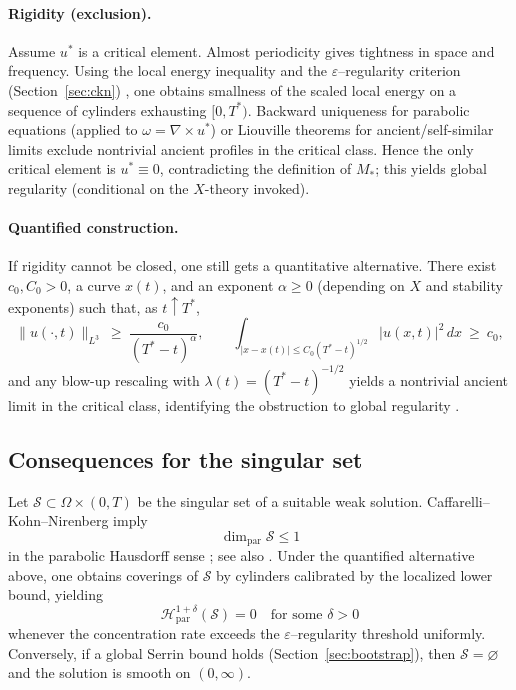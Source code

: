 \IfFileExists{nyjm.cls}{\documentclass[11pt]{nyjm}}{\documentclass[11pt]{amsart}}
\theoremstyle{plain}
\theoremstyle{definition}
\theoremstyle{remark}
\begin{document}
\paragraph{Rigidity (exclusion).}
Assume $u^\ast$ is a critical element. Almost periodicity gives tightness in space and frequency. Using the local energy inequality and the $\varepsilon$–regularity criterion (Section~\ref{sec:ckn}) \cite{CaffarelliKohnNirenberg1982,Lin1998}, one obtains smallness of the scaled local energy on a sequence of cylinders exhausting $[0,T^\ast)$. Backward uniqueness for parabolic equations \cite{EscauriazaSereginSverak2003} (applied to $\omega=\nabla\times u^\ast$) or Liouville theorems for ancient/self-similar limits \cite{NecasRuzickaSverak1996,Tsai1998} exclude nontrivial ancient profiles in the critical class. Hence the only critical element is $u^\ast\equiv0$, contradicting the definition of $M_\ast$; this yields global regularity (conditional on the $X$-theory invoked).

\paragraph{Quantified construction.}
If rigidity cannot be closed, one still gets a quantitative alternative. There exist $c_0,C_0>0$, a curve $x(t)$, and an exponent $\alpha\ge0$ (depending on $X$ and stability exponents) such that, as $t\uparrow T^\ast$,
\[
\|u(\cdot,t)\|_{L^3}\ \ge\ \frac{c_0}{(T^\ast-t)^{\alpha}},\qquad
\int_{|x-x(t)|\le C_0 (T^\ast-t)^{1/2}} |u(x,t)|^2\,dx \ \ge\ c_0,
\]
and any blow-up rescaling with $\lambda(t)=(T^\ast-t)^{-1/2}$ yields a nontrivial ancient limit in the critical class, identifying the obstruction to global regularity \cite{EscauriazaSereginSverak2003,LemarieRieusset2002}.

\subsection{Consequences for the singular set}\label{subsec:singular-set}
Let $\mathcal S\subset\Omega\times(0,T)$ be the singular set of a suitable weak solution. Caffarelli–Kohn–Nirenberg imply
\[
\dim_{\mathrm{par}}\mathcal S\le 1
\]
in the parabolic Hausdorff sense \cite{CaffarelliKohnNirenberg1982}; see also \cite{Lin1998}. Under the quantified alternative above, one obtains coverings of $\mathcal S$ by cylinders calibrated by the localized lower bound, yielding
\[
\mathcal H^{1+\delta}_{\mathrm{par}}(\mathcal S)=0\quad\text{for some }\delta>0
\]
whenever the concentration rate exceeds the $\varepsilon$–regularity threshold uniformly. Conversely, if a global Serrin bound holds (Section~\ref{sec:bootstrap}), then $\mathcal S=\varnothing$ and the solution is smooth on $(0,\infty)$.
\end{document}

